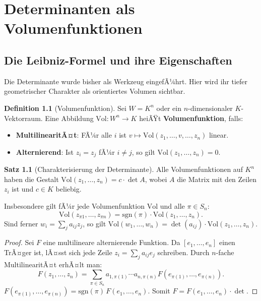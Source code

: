 ﻿\documentclass[a4paper,12pt]{report}
\theoremstyle{definition}
\newtheorem{definition}{Definition}
\newtheorem{satz}{Satz}
\begin{document}
\chapter{Determinanten als Volumenfunktionen}

\section{Die Leibniz-Formel und ihre Eigenschaften}

Die Determinante wurde bisher als Werkzeug eingefÃ¼hrt. Hier wird ihr
tiefer geometrischer Charakter als orientiertes Volumen sichtbar.

\begin{definition}[Volumenfunktion]
    Sei $W = K^n$ oder ein $n$-dimensionaler $K$-Vektorraum. Eine Abbildung
    $\mathrm{Vol} : W^n \to K$ heiÃŸt \textbf{Volumenfunktion}, falls:
    \begin{itemize}
        \item[-] \textbf{MultilinearitÃ¤t}: FÃ¼r alle $i$ ist
              $v \mapsto \mathrm{Vol}(z_1, \dots, v, \dots, z_n)$ linear.
        \item[-] \textbf{Alternierend}: Ist $z_i = z_j$ fÃ¼r $i \neq j$,
              so gilt $\mathrm{Vol}(z_1, \dots, z_n) = 0$.
    \end{itemize}
\end{definition}

\begin{satz}[Charakterisierung der Determinante]
    Alle Volumenfunktionen auf $K^n$ haben die Gestalt
    $\mathrm{Vol}(z_1, \dots, z_n) = c \cdot \det A$, wobei $A$ die Matrix
    mit den Zeilen $z_i$ ist und $c \in K$ beliebig.

    Insbesondere gilt fÃ¼r jede Volumenfunktion $\mathrm{Vol}$ und alle
    $\pi \in S_n$:
    \[
        \mathrm{Vol}(z_{\pi 1}, \dots, z_{\pi n})
        = \mathrm{sgn}(\pi) \cdot \mathrm{Vol}(z_1, \dots, z_n).
    \]
    Sind ferner $w_i = \sum_j a_{ij} z_j$, so gilt
    $\mathrm{Vol}(w_1, \dots, w_n) = \det(a_{ij}) \cdot \mathrm{Vol}(z_1, \dots, z_n)$.
\end{satz}
\begin{proof}
    Sei $F$ eine multilineare alternierende Funktion. Da $[e_1, \ldots, e_n]$ einen TrÃ¤ger ist,
    lÃ¤sst sich jede Zeile $z_i = \sum_j a_{ij} e_j$ schreiben. Durch $n$-fache
    MultilinearitÃ¤t erhÃ¤lt man:
    \[
        F(z_1, \ldots, z_n) = \sum_{\pi \in S_n} a_{1,\pi(1)} \cdots a_{n,\pi(n)}
        F(e_{\pi(1)}, \ldots, e_{\pi(n)}).
    \]
    $F(e_{\pi(1)}, \ldots, e_{\pi(n)})
    = \mathrm{sgn}(\pi)\, F(e_1, \ldots, e_n)$.
    Somit $F = F(e_1,\ldots,e_n) \cdot \det$.
\end{proof}
\end{document}
